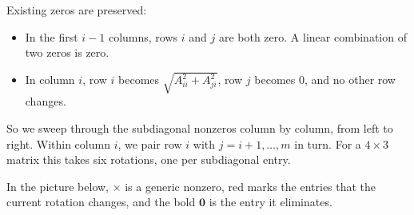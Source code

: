 Existing zeros are preserved:
\begin{itemize}
  \item In the first $i - 1$ columns, rows $i$ and $j$ are both zero. A linear combination of two zeros is zero.
  \item In column $i$, row $i$ becomes $\sqrt{A_{ii}^2 + A_{ji}^2}$, row $j$ becomes $0$, and no other row changes.
\end{itemize}
So we sweep through the subdiagonal nonzeros column by column, from left to right. Within column $i$, we pair row $i$ with $j = i + 1, \dots, m$ in turn. For a $4 \times 3$ matrix this takes six rotations, one per subdiagonal entry.

In the picture below, $\times$ is a generic nonzero, red marks the entries that the current rotation changes, and the bold $\bm{0}$ is the entry it eliminates.
\begingroup
\newcommand*{\Xc}{\textcolor{red!70!black}{\times}}
\newcommand*{\Zc}{\textcolor{red!70!black}{\bm{0}}}
